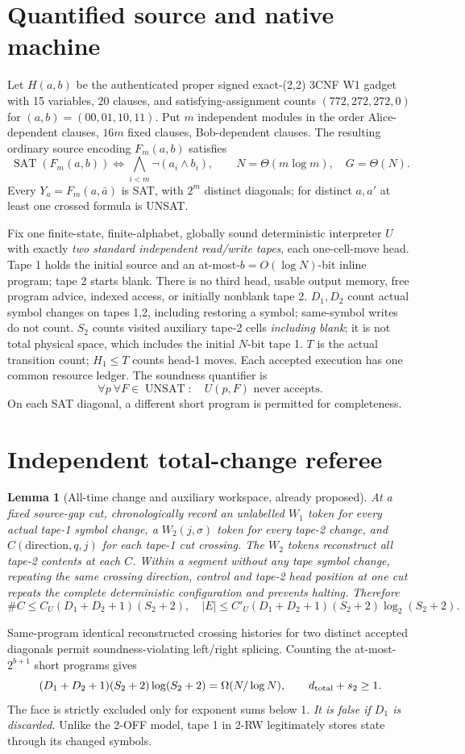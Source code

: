 \documentclass[11pt]{article}
\newtheorem{lemma}[theorem]{Lemma}
\begin{document}
\section*{Quantified source and native machine}
Let $H(a,b)$ be the authenticated proper signed exact-(2,2) 3CNF W1 gadget with 15 variables, 20 clauses, and satisfying-assignment counts $(772,272,272,0)$ for $(a,b)=(00,01,10,11)$. Put $m$ independent modules in the order Alice-dependent clauses, $16m$ fixed clauses, Bob-dependent clauses. The resulting ordinary source encoding $F_m(a,b)$ satisfies
\[
 \operatorname{SAT}(F_m(a,b))\iff \bigwedge_{i<m}\neg(a_i\land b_i),
 \qquad N=\Theta(m\log m),\quad G=\Theta(N).
\]
Every $Y_a=F_m(a,\bar a)$ is SAT, with $2^m$ distinct diagonals; for distinct $a,a'$ at least one crossed formula is UNSAT.

Fix one finite-state, finite-alphabet, globally sound deterministic interpreter $U$ with exactly \emph{two standard independent read/write tapes}, each one-cell-move head. Tape 1 holds the initial source and an at-most-$b=O(\log N)$-bit inline program; tape 2 starts blank. There is no third head, usable output memory, free program advice, indexed access, or initially nonblank tape 2. $D_1,D_2$ count actual symbol changes on tapes 1,2, including restoring a symbol; same-symbol writes do not count. $S_2$ counts visited auxiliary tape-2 cells \emph{including blank}; it is not total physical space, which includes the initial $N$-bit tape 1. $T$ is the actual transition count; $H_1\le T$ counts head-1 moves. Each accepted execution has one common resource ledger. The soundness quantifier is
\[
 \forall p\ \forall F\in\operatorname{UNSAT}:
 \quad U(p,F)\text{ never accepts}.
\]
On each SAT diagonal, a different short program is permitted for completeness.

\section*{Independent total-change referee}
\begin{lemma}[All-time change and auxiliary workspace, already proposed]
At a fixed source-gap cut, chronologically record an unlabelled $W_1$ token for every actual tape-1 symbol change, a $W_2(j,\sigma)$ token for every tape-2 change, and $C(\mathrm{direction},q,j)$ for each tape-1 cut crossing. The $W_2$ tokens reconstruct all tape-2 contents at each $C$. Within a segment without any tape symbol change, repeating the same crossing direction, control and tape-2 head position at one cut repeats the complete deterministic configuration and prevents halting. Therefore
\[
 \#C\le C_U(D_1+D_2+1)(S_2+2),\quad
 |E|\le C'_U(D_1+D_2+1)(S_2+2)\log_2(S_2+2).
\]
\end{lemma}
Same-program identical reconstructed crossing histories for two distinct accepted diagonals permit soundness-violating left/right splicing. Counting the at-most-$2^{b+1}$ short programs gives
\[
 (D_1+D_2+1)(S_2+2)\log(S_2+2)=\Omega(N/\log N),
 \qquad d_{\rm total}+s_2\ge1.
\]
The face is strictly excluded only for exponent sums below 1. \emph{It is false if $D_1$ is discarded.} Unlike the 2-OFF model, tape 1 in 2-RW legitimately stores state through its changed symbols.
\end{document}

